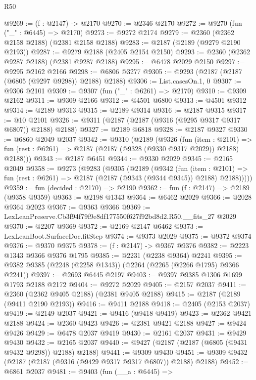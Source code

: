 \begin{lexlean}{R50}
\begin{coremodule}
@9269 := (f : @2147) -> @2170
@9270 := @2346 @2170
@9272 := @9270 (fun ("_" : @6445) => @2170)
@9273 := @9272 @2174
@9279 := @2360 (@2362 @2158 @2188) (@2381 @2158 @2188)
@9283 := @2187 (@2189 (@9279 @2190 @2193))
@9287 := @9279 @2188 (@2405 @2154 @2150)
@9293 := @2360 (@2362 @9287 @2188) (@2381 @9287 @2188)
@9295 := @6478 @2029 @2150
@9297 := @9295 @2162 @2166
@9298 := @6806 @3277
@9305 := @9293 (@2187 (@2187 (@6805 (@9297 @9298)) @2188) @2188)
@9306 := List.casesOn.{1, 0}
@9307 := @9306 @2101
@9309 := @9307 (fun ("_" : @6261) => @2170)
@9310 := @9309 @2162
@9311 := @9309 @2166
@9312 := @4501 @6800
@9313 := @4501 @9312
@9314 := @2189 @9313
@9315 := @2189 @9314
@9316 := @2187 @9315
@9317 := @10 @2101
@9326 := @9311 (@2187 (@2187 (@9316 (@9295 @9317 @9317 @6807)) @2188) @2188)
@9327 := @2189 @6818
@9328 := @2187 @9327
@9330 := @6860 @2049 @2037
@9342 := @9310
    (@2189
      (@9326
        (fun (item : @2101) =>
        fun (rest : @6261) => @2187 (@2187 (@9328 (@9330 @9317 @2029)) @2188) @2188)))
@9343 := @2187 @6451
@9344 := @9330 @2029
@9345 := @2165 @2049
@9358 := @9273
    (@9283
      (@9305
        (@2189
          (@9342
            (fun (item : @2101) =>
            fun (rest : @6261) => @2187 (@2187 (@9343 (@9344 @9345)) @2188) @2188)))))
@9359 := fun (decided : @2170) => @2190
@9362 := fun (f : @2147) => @2189 (@9358 @9359)
@9363 := @2198 @1343
@9364 := @6462 @2029
@9366 := @2028 @9364 @2023
@9367 := @9363 @9366
@9369 := LexLeanPreserve.Cb3f94f79f9e8df177550f627f92bd8d2.R50.__fits_27 @2029
@9370 := @2207 @9369
@9372 := @2169 @2147 @6462
@9373 := LexLeanBoot.SurfaceDoc.fitStep
@9374 := @9373 @2029
@9375 := @9372 @9374
@9376 := @9370 @9375
@9378 := (f : @2147) -> @9367 @9376
@9382 := @2223 @1343 @9366 @9376 @1795
@9385 := @2231 (@2238 @9364) @2241
@9395 := @9382 @9385 (@2248 (@2258 @1343)) (@2264 (@2265 (@2266 @1795) @9366 @2241))
@9397 := @2693 @6445 @2197
@9403 := @9397 @9385 @1306 @1699 @1793 @2188 @2172
@9404 := @9272 @2029
@9405 := @2157 @2037
@9411 := @2360 (@2362 @9405 @2188) (@2381 @9405 @2188)
@9415 := @2187 (@2189 (@9411 @2190 @2193))
@9416 := @9411 @2188
@9418 := @2405 (@2153 @2037)
@9419 := @2149 @2037
@9421 := @9416 (@9418 @9419)
@9423 := @2362 @9421 @2188
@9424 := @2360 @9423
@9426 := @2381 @9421 @2188
@9427 := @9424 @9426
@9429 := @6478 @2037 @9419
@9430 := @2161 @2037
@9431 := @9429 @9430
@9432 := @2165 @2037
@9440 := @9427 (@2187 (@2187 (@6805 (@9431 @9432 @9298)) @2188) @2188)
@9441 := @9309 @9430
@9451 := @9309 @9432 (@2187 (@2187 (@9316 (@9429 @9317 @9317 @6807)) @2188) @2188)
@9452 := @6861 @2037
@9481 := @9403
    (fun (__a : @6445) =>

\end{coremodule}
\end{lexlean}
